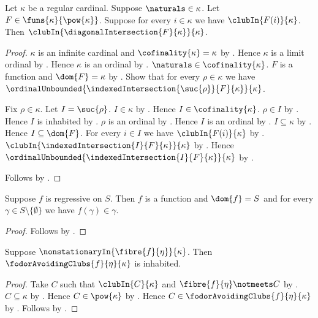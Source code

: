 \begin{theorem}\label{diagonal_club_intersection_regular}
    Let $\kappa$ be a regular cardinal.
    Suppose $\naturals\in\kappa$.
    Let $F\in\funs{\kappa}{\pow{\kappa}}$.
    Suppose for every $i\in\kappa$ we have $\clubIn{F(i)}{\kappa}$.
    Then $\clubIn{\diagonalIntersection{F}{\kappa}}{\kappa}$.
\end{theorem}
\begin{proof}
    $\kappa$ is an infinite cardinal and
        $\cofinality{\kappa}=\kappa$ by .
    Hence $\kappa$ is a limit ordinal
        by .
    Hence $\kappa$ is an ordinal by .
    $\naturals\in\cofinality{\kappa}$.
    $F$ is a function and $\dom{F}=\kappa$
        by .
    Show that for every $\rho\in\kappa$ we have
        $\ordinalUnbounded{
            \indexedIntersection{\suc{\rho}}{F}{\kappa}}{\kappa}$.
    \begin{subproof}
        Fix $\rho\in\kappa$.
        Let $I=\suc{\rho}$.
        $I\in\kappa$ by .
        Hence $I\in\cofinality{\kappa}$.
        $\rho\in I$ by .
        Hence $I$ is inhabited by \auto.
        $\rho$ is an ordinal by .
        Hence $I$ is an ordinal by .
        $I\subseteq\kappa$ by .
        Hence $I\subseteq\dom{F}$.
        For every $i\in I$ we have $\clubIn{F(i)}{\kappa}$
            by .
        $\clubIn{\indexedIntersection{I}{F}{\kappa}}{\kappa}$
            by .
        Hence $\ordinalUnbounded{
            \indexedIntersection{I}{F}{\kappa}}{\kappa}$
            by .
    \end{subproof}
    Follows by .
\end{proof}

\begin{proposition}\label{regressive_on_elim}
    Suppose $f$ is regressive on $S$.
    Then $f$ is a function and $\dom{f}=S$ and
        for every $\gamma\in S\setminus\{\emptyset\}$ we have
            $f(\gamma)\in\gamma$.
\end{proposition}
\begin{proof}
    Follows by .
\end{proof}

\begin{proposition}\label{fodor_avoiding_clubs_inhabited}
    Suppose $\nonstationaryIn{\fibre{f}{\eta}}{\kappa}$.
    Then $\fodorAvoidingClubs{f}{\eta}{\kappa}$ is inhabited.
\end{proposition}
\begin{proof}
    Take $C$ such that $\clubIn{C}{\kappa}$ and
        $\fibre{f}{\eta}\notmeets C$ by .
    $C\subseteq\kappa$ by .
    Hence $C\in\pow{\kappa}$ by .
    Hence $C\in\fodorAvoidingClubs{f}{\eta}{\kappa}$
        by .
    Follows by \auto.
\end{proof}

